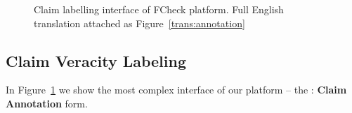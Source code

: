 \begin{figure}[H]
\thispagestyle{empty}
\vspace{-2cm}

\caption[Claim labelling interface of \textsf{FCheck} platform]{Claim labelling interface of \textsf{FCheck} platform. Full English translation attached as Figure~\ref{trans:annotation}}

\label{fig:annotation}
\end{figure} %
\pagebreak


\subsection{Claim Veracity Labeling}
\label{sec:ui-labeling}
In Figure~\ref{fig:annotation} we show the most complex interface of our platform -- the \tdva{}: \textbf{Claim Annotation} form. 


